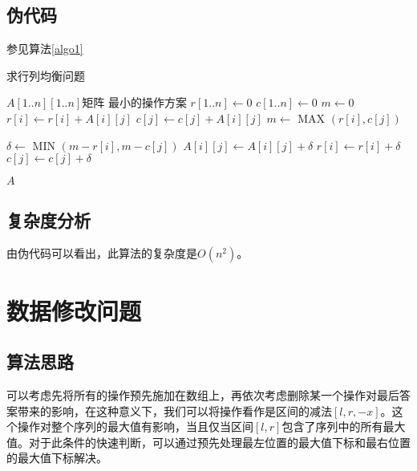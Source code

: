 \documentclass[UTF8]{ctexart}
\begin{document}
    \subsection*{伪代码}
    参见算法\ref{algo1}

    \begin{algorithm}
        \caption{求行列均衡问题}
        \begin{algorithmic}[1]
            \Require $A[1..n][1..n]$矩阵
            \Ensure 最小的操作方案
                \State $r[1..n] \gets 0$
                \State $c[1..n] \gets 0$
                \State $m \gets 0$
                        \State $r[i] \gets r[i] + A[i][j]$
                        \State $c[j] \gets c[j] + A[i][j]$
                        \State $m \gets$ MAX $(r[i], c[j])$
                    \EndFor
                \EndFor

                        \State $\delta \gets$ MIN $(m - r[i], m - c[j])$
                        \State $A[i][j] \gets A[i][j] + \delta$
                        \State $r[i] \gets r[i] + \delta$
                        \State $c[j] \gets c[j] + \delta$
                    \EndFor
                \EndFor

                \State \Return $A$
            \EndFunction
    
        \end{algorithmic}
        \label{algo1}
    \end{algorithm}

    \subsection*{复杂度分析}
    由伪代码可以看出，此算法的复杂度是$O(n^2)$。

\section{数据修改问题} %
    \subsection*{算法思路}
        可以考虑先将所有的操作预先施加在数组上，再依次考虑删除某一个操作对最后答案带来的影响，在这种意义下，我们可以将操作看作是区间的减法$[l, r, -x]$。这个操作对整个序列的最大值有影响，当且仅当区间$[l, r]$包含了序列中的所有最大值。对于此条件的快速判断，可以通过预先处理最左位置的最大值下标和最右位置的最大值下标解决。
\end{document}
